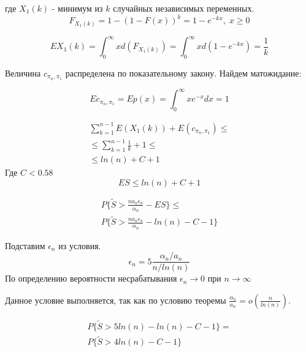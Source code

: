 \documentclass[a4paper, 14pt]{extarticle}
\begin{document}
где $X_1(k)$ - минимум из $k$ случайных независимых переменных.
\begin{equation}
F_{X_1(k)} = 1 - (1-F(x))^k = 1 - e^{-kx}, \; x \geq 0
\end{equation}

\begin{equation}
EX_1(k) = \int_0^\infty xd(F_{X_1(k)}) =\int_0^\infty xd(1-e^{-kx}) = \frac{1}{k}
\end{equation}

Величина $c_{\pi_n, \pi_1}$ распределена по показательному закону. Найдем матожидание:

\begin{equation}
Ec_{\pi_n, \pi_1} = Ep(x) = \int_0^\infty xe^{-x}dx = 1
\end{equation}

\begin{equation}
\begin{aligned}
\sum_{k=1}^{n-1} E(X_1(k)) + E(c_{\pi_n, \pi_1}) \leq \\
 \leq \sum_{k=1}^{n-1} \frac{1}{k} + 1 \leq \\
 \leq ln(n) + C + 1
\end{aligned}
\end{equation}
Где $C < 0.58$
\begin{equation}
ES \leq ln(n) + C + 1
\end{equation}

\begin{equation}
\begin{aligned}
P\{\tilde{S} >\frac{na_n\epsilon_n}{\alpha_n} - ES  \} \leq \\
P\{\tilde{S} >\frac{na_n\epsilon_n}{\alpha_n} - ln(n) - C - 1  \} \end{aligned}
\end{equation}

Подставим $\epsilon_n$ из условия.
\begin{equation}
\epsilon_n = 5 \frac{\alpha_n/a_n}{n/ln(n)}
\end{equation}
По определению вероятности несрабатывания $\epsilon_n \rightarrow 0$ при $n \rightarrow \infty$

Данное условие выполняется, так как по условию теоремы $\frac{\alpha_n}{a_n} = o(\frac{n}{ln(n)})$.

\begin{equation}
\begin{aligned}
P\{\tilde{S} >5ln(n) - ln(n) - C - 1  \} = \\
P\{\tilde{S} >4ln(n) - C - 1  \}
\end{aligned}
\end{equation}
\end{document}
